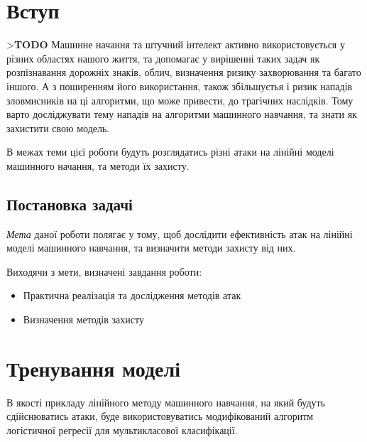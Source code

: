 \documentclass[a4paper,14pt]{extreport}
\begin{document}
	
	\tableofcontents
	\newpage
	
	
	\chapter{Вступ}
	\textgreater\textbf{TODO}
	Машинне начання та штучний інтелект активно використовується у різних областях нашого життя, та допомагає у вирішенні таких задач як розпізнавання дорожніх знаків, облич, визначення ризику захворювання та багато іншого.
	А з поширенням його використання, також збільшуєтья і ризик нападів зловмисників на ці алгоритми, що може привести, до трагічних наслідків. Тому варто досліджувати тему нападів на алгоритми машинного навчання, та знати як захистити свою модель. \par
	В межах теми цієї роботи будуть розглядатись різні атаки на лінійні моделі машинного начання, та методи їх захисту.
	
	
	\section{Постановка задачі} 
	\textit{Мета} даної роботи полягає у тому, щоб дослідити ефективність атак на лінійні моделі машинного навчання, та визначити методи захисту від них. \par
	Виходячи з мети, визначені завдання роботи:
	\begin{itemize}  
	\item Практична реалізація та дослідження методів атак
	\item Визначення методів захисту
	\end{itemize}
	
	\chapter{Тренування моделі}
	В якості прикладу лінійного методу машинного навчання, на який будуть сдійснюватись атаки, буде використовуватись модифікований алгоритм логістичної регресії для мультикласової класифікації.
	
\end{document}
